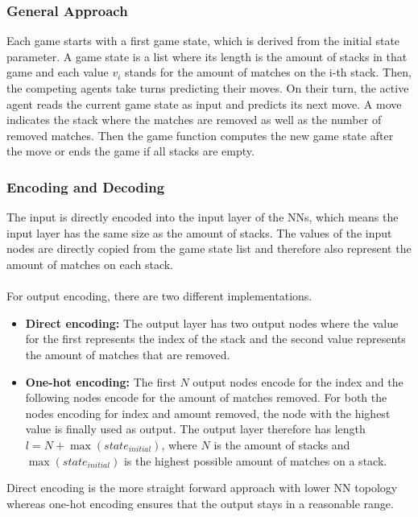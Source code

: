 \subsubsection{General Approach}
Each game starts with a first game state, which is derived from the initial state parameter.
A game state is a list where its length is the amount of stacks in that game and each value $v_i$ stands for the amount of matches on the i-th stack.
Then, the competing agents take turns predicting their moves.
On their turn, the active agent reads the current game state as input and predicts its next move.
A move indicates the stack where the matches are removed as well as the number of removed matches.
Then the game function computes the new game state after the move or ends the game if all stacks are empty.

\subsubsection{Encoding and Decoding}
The input is directly encoded into the input layer of the NNs, which means the input layer has the same size as the amount of stacks.
The values of the input nodes are directly copied from the game state list and therefore also represent the amount of matches on each stack.
\\ \\
For output encoding, there are two different implementations.
\begin{itemize}
    \item \textbf{Direct encoding:} The output layer has two output nodes where the value for the first represents the index of the stack and the second value represents the amount of matches that are removed.
    \item \textbf{One-hot encoding:} The first $N$ output nodes encode for the index and the following nodes encode for the amount of matches removed.
    For both the nodes encoding for index and amount removed, the node with the highest value is finally used as output.
    The output layer therefore has length $l = N + \max(state_{initial})$, where $N$ is the amount of stacks and $\max(state_{initial})$ is the highest possible amount of matches on a stack.
\end{itemize}
Direct encoding is the more straight forward approach with lower NN topology whereas one-hot encoding ensures that the output stays in a reasonable range.

